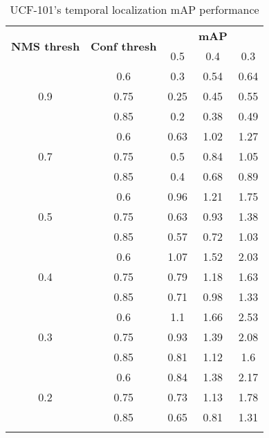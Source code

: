 \begin{center}
  \begin{longtable}{|| c | c || c c c ||}

    \hline
    \multirow{2}{*}{\textbf{NMS thresh}} & \multirow{2}{*}{\textbf{Conf thresh}} & {} & \textbf{mAP} & {}  \\
    {} & {} & 0.5 & 0.4 & 0.3\\
    \hline
    \multirow{3}{*}{0.9} & {0.6} & 0.3 & 0.54 & 0.64 \\
    \cline{2-5}
    {} & {0.75} & 0.25 & 0.45 & 0.55 \\
    \cline{2-5}
    {} & {0.85} & 0.2 & 0.38 & 0.49  \\
    \hline
    \multirow{3}{*}{0.7} & {0.6} & 0.63 & 1.02 & 1.27 \\
    \cline{2-5}
    {} & {0.75} & 0.5 & 0.84 & 1.05 \\
    \cline{2-5}
    {} & {0.85} & 0.4 & 0.68 & 0.89 \\
    \hline
    \multirow{3}{*}{0.5} & {0.6} & 0.96 & 1.21 & 1.75 \\
    \cline{2-5}
    {} & {0.75} &  0.63 & 0.93 & 1.38 \\
    \cline{2-5}
    {} & {0.85} & 0.57 & 0.72 & 1.03 \\
    \hline
    \multirow{3}{*}{0.4} & {0.6} & 1.07 & 1.52 & 2.03 \\
    \cline{2-5}
    {} & {0.75} &  0.79 & 1.18 & 1.63 \\
    \cline{2-5}
    {} & {0.85} & 0.71 & 0.98 & 1.33 \\
    \hline
    \multirow{3}{*}{0.3} & {0.6} & 1.1 & 1.66 & 2.53 \\
    \cline{2-5}
    {} & {0.75} &  0.93 & 1.39 & 2.08 \\
    \cline{2-5}
    {} & {0.85} & 0.81 & 1.12 & 1.6 \\
    \hline
    \multirow{3}{*}{0.2} & {0.6} & 0.84 & 1.38 & 2.17 \\
    \cline{2-5}
    {} & {0.75} & 0.73 & 1.13 & 1.78 \\
    \cline{2-5}
    {} & {0.85} & 0.65 & 0.81 & 1.31 \\

    \hline

    \caption{UCF-101's temporal localization mAP performance}
    \label{table:temp_cls_1}
  \end{longtable}
\end{center}

